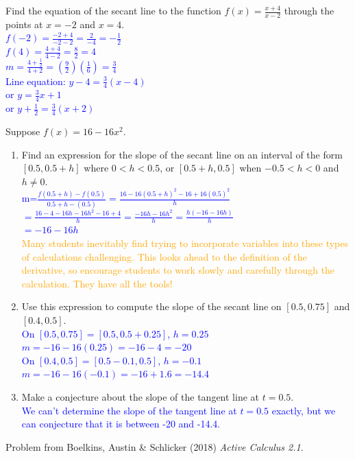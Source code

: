 \documentclass{ximera}
\begin{document}
\begin{exercise}
  Find the equation of the secant line to the function $f(x)=\frac{x+4}{x-2}$ through the points at $x=-2$ and $x=4$.\\
  \textcolor{blue}{ $f(-2)=\frac{-2+4}{-2-2}=\frac{2}{-4}=-\frac12$\\
    $f(4)=\frac{4+4}{4-2}=\frac{8}{2}=4$\\
    $m=\frac{4+\frac12}{4+2}=(\frac{9}{2})(\frac16)=\frac34$\\
    Line equation: $y-4=\frac34(x-4)$\\
    or $y=\frac34x+1$\\
    or $y+\frac12=\frac34(x+2)$}
\end{exercise}

\begin{exercise}
  Suppose $f(x)=16-16x^2$.
  \begin{enumerate}
    \item Find an expression for the slope of the secant line on an interval of the form $[0.5, 0.5+h]$ where $0<h<0.5$, or $[0.5+h,0.5]$ when $-0.5<h<0$ and $h\neq 0$.\\
    \textcolor{blue}{m=$\frac{f(0.5+h)-f(0.5)}{0.5+h-(0.5)}=\frac{16-16(0.5+h)^2-16+16(0.5)^2}{h}$
    $=\frac{16-4-16h-16h^2-16+4}{h}=\frac{-16h-16h^2}{h}=\frac{h(-16-16h)}{h}$\\
    $=-16-16h$}\\
    \textcolor{orange}{Many students inevitably find trying to incorporate variables into these types of calculations challenging.  This looks ahead to the definition of the derivative, so encourage students to work slowly and carefully through the calculation.  They have all the tools!}
    \item Use this expression to compute the slope of the secant line on $[0.5, 0.75]$ and $[0.4, 0.5]$.\\
    \textcolor{blue}{On $[0.5,0.75]=[0.5,0.5+0.25]$, $h=0.25$\\
    $m=-16-16(0.25)=-16-4=-20$\\
    On $[0.4,0.5]=[0.5-0.1,0.5]$, $h=-0.1$\\
    $m=-16-16(-0.1)=-16+1.6=-14.4$}
    \item Make a conjecture about the slope of the tangent line at $t=0.5$. \\
    \textcolor{blue}{We can't determine the slope of the tangent line at $t=0.5$ exactly, but we can conjecture that it is between -20 and -14.4.}
  \end{enumerate}
  Problem from Boelkins, Austin \& Schlicker (2018) \textit{Active Calculus 2.1}.
\end{exercise}
\end{document}
